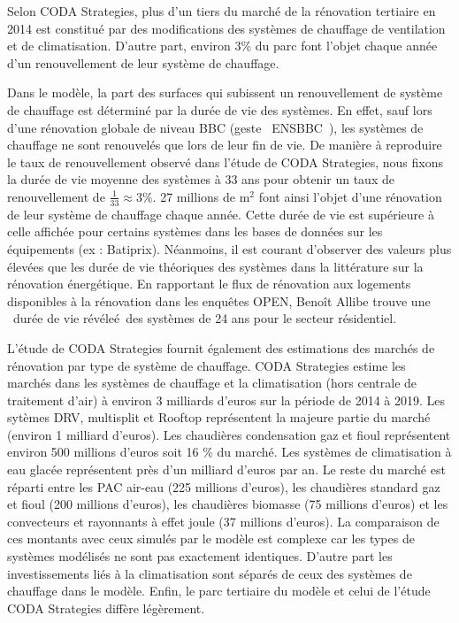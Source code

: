 \documentclass[10.5pt,a4paper]{article}
\begin{document}
{Selon CODA Strategies, plus d'un tiers du marché de la rénovation tertiaire en 2014 est constitué par des modifications des systèmes de chauffage de ventilation et de climatisation. D'autre part, environ 3\% du parc font l'objet chaque année d'un renouvellement de leur système de chauffage.

Dans le modèle, la part des surfaces qui subissent un renouvellement de système de chauffage est déterminé par la durée de vie des systèmes. En effet, sauf lors d'une rénovation globale de niveau BBC (geste \og~ENSBBC~\fg), les systèmes de chauffage ne sont renouvelés que lors de leur fin de vie. De manière à reproduire le taux de renouvellement observé dans l'étude de CODA Strategies, nous fixons la durée de vie moyenne des systèmes à 33 ans pour obtenir un taux de renouvellement de $\frac{1}{33} \approx 3 \%$. 27 millions de m$^2$ font ainsi l'objet d'une rénovation de leur système de chauffage chaque année. Cette durée de vie est supérieure à celle affichée pour certains systèmes dans les bases de données sur les équipements (ex : Batiprix). Néanmoins, il est courant d'observer des valeurs plus élevées que les durée de vie théoriques des systèmes dans la littérature sur la rénovation énergétique. En rapportant le flux de rénovation aux logements disponibles à la rénovation dans les enquêtes OPEN, Benoît Allibe \citep{Allibe2012} trouve une \og~durée de vie révéleé~\fg des systèmes de 24 ans pour le secteur résidentiel. 

L'étude de CODA Strategies fournit également des estimations des marchés de rénovation par type de système de chauffage. CODA Strategies estime les marchés dans les systèmes de chauffage et la climatisation (hors centrale de traitement d'air) à environ 3 milliards d'euros sur la période de 2014 à 2019. Les sytèmes DRV, multisplit et Rooftop représentent la majeure partie du marché (environ 1 milliard d'euros).  Les chaudières condensation gaz et fioul représentent environ 500 millions d'euros soit 16 \%  du marché. Les systèmes de climatisation à eau glacée représentent près d'un milliard d'euros par an. Le reste du marché est réparti entre les PAC air-eau (225 millions d'euros), les chaudières standard gaz et fioul (200 millions d'euros), les chaudières biomasse (75 millions d'euros) et les convecteurs et rayonnants à effet joule (37 millions d'euros). La comparaison de ces montants avec ceux simulés par le modèle est complexe car les types de systèmes modélisés ne sont pas exactement identiques. D'autre part les investissements liés à la climatisation sont séparés de ceux des systèmes de chauffage dans le modèle. Enfin, le parc tertiaire du modèle et celui de l'étude CODA Strategies diffère légèrement.  

}
\end{document}
